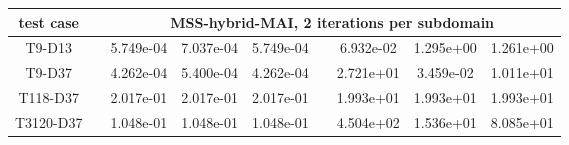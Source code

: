 \begin{table}[h]
\begin{adjustbox}{width=1\textwidth} %
\small
\begin{tabular}{ccccccccc}
\toprule
{test case} && \multicolumn{7}{c}{MSS-hybrid-MAI, 2 iterations per subdomain}   \\
\midrule
T9-D13       &&  5.749e-04 &  7.037e-04 &  5.749e-04 &&  6.932e-02 &  1.295e+00 &  1.261e+00 \\
T9-D37       &&  4.262e-04 &  5.400e-04 &  4.262e-04 &&  2.721e+01 &  3.459e-02 &  1.011e+01 \\
T118-D37     &&  2.017e-01 &  2.017e-01 &  2.017e-01 &&  1.993e+01 &  1.993e+01 &  1.993e+01 \\
T3120-D37    &&  1.048e-01 &  1.048e-01 &  1.048e-01 &&  4.504e+02 &  1.536e+01 &  8.085e+01 \\
\bottomrule
\end{tabular}
\end{adjustbox}
\end{table}